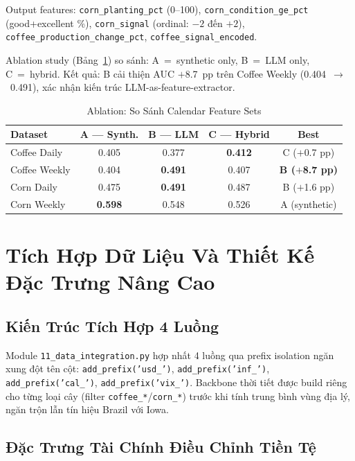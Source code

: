 \documentclass[conference]{IEEEtran}
\begin{document}
Output features: \texttt{corn\_planting\_pct} (0--100),
\texttt{corn\_condition\_ge\_pct} (good+excellent \%), \texttt{corn\_signal}
(ordinal: $-2$ đến $+2$), \texttt{coffee\_production\_change\_pct},
\texttt{coffee\_signal\_encoded}.

Ablation study (Bảng~\ref{tab:llm_ablation}) so sánh: A~=~synthetic only,
B~=~LLM only, C~=~hybrid. Kết quả: B cải thiện AUC $+$8.7~pp trên Coffee
Weekly (0.404~$\to$~0.491), xác nhận kiến trúc LLM-as-feature-extractor.

\begin{table}[htbp]
\caption{Ablation: So Sánh Calendar Feature Sets}
\label{tab:llm_ablation}
\centering
\begin{tabular}{@{}lcccc@{}}
\toprule
\textbf{Dataset} & \textbf{A — Synth.} & \textbf{B — LLM} & \textbf{C — Hybrid} & \textbf{Best} \\
\midrule
Coffee Daily  & 0.405 & 0.377 & \textbf{0.412} & C ($+$0.7 pp) \\
Coffee Weekly & 0.404 & \textbf{0.491} & 0.407 & \textbf{B ($+$8.7 pp)} \\
Corn Daily    & 0.475 & \textbf{0.491} & 0.487 & B ($+$1.6 pp) \\
Corn Weekly   & \textbf{0.598} & 0.548 & 0.526 & A (synthetic) \\
\bottomrule
\end{tabular}
\end{table}

\section{Tích Hợp Dữ Liệu Và Thiết Kế Đặc Trưng Nâng Cao}

\subsection{Kiến Trúc Tích Hợp 4 Luồng}

Module \texttt{11\_data\_integration.py} hợp nhất 4 luồng qua prefix
isolation ngăn xung đột tên cột: \texttt{add\_prefix('usd\_')},
\texttt{add\_prefix('inf\_')}, \texttt{add\_prefix('cal\_')},
\texttt{add\_prefix('vix\_')}. Backbone thời tiết được build riêng cho từng
loại cây (filter \texttt{coffee\_*}/\texttt{corn\_*}) trước khi tính trung
bình vùng địa lý, ngăn trộn lẫn tín hiệu Brazil với Iowa.

\subsection{Đặc Trưng Tài Chính Điều Chỉnh Tiền Tệ}
\end{document}
